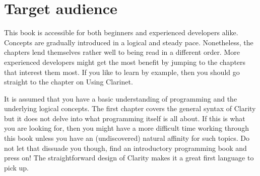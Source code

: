 \section{Target audience}

This book is accessible for both beginners and experienced developers alike. Concepts are gradually introduced in a logical and steady pace. Nonetheless, the chapters lend themselves rather well to being read in a different order. More experienced developers might get the most benefit by jumping to the chapters that interest them most. If you like to learn by example, then you should go straight to the chapter on Using Clarinet.

It is assumed that you have a basic understanding of programming and the underlying logical concepts. The first chapter covers the general syntax of Clarity but it does not delve into what programming itself is all about. If this is what you are looking for, then you might have a more difficult time working through this book unless you have an (undiscovered) natural affinity for such topics. Do not let that dissuade you though, find an introductory programming book and press on! The straightforward design of Clarity makes it a great first language to pick up.

